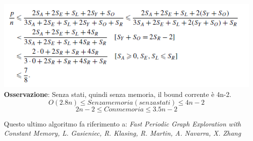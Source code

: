 \includegraphics[]{capitoli/esplorazione-grafo-anonimo/imgs/66.png}\\
\textbf{Osservazione}: Senza stati, quindi senza memoria, il bound corrente è
4n-2.\\
$$O(2.8n) \leq Senza memoria (senza stati) \leq 4n-2$$
$$2n-2 \leq Con memoria \leq 3.5n -2 $$

Questo ultimo algoritmo fa riferimento a: \emph{Fast Periodic Graph Exploration
    with Constant Memory, L. Gasieniec, R. Klasing, R. Martin, A. Navarra, X.
    Zhang}
